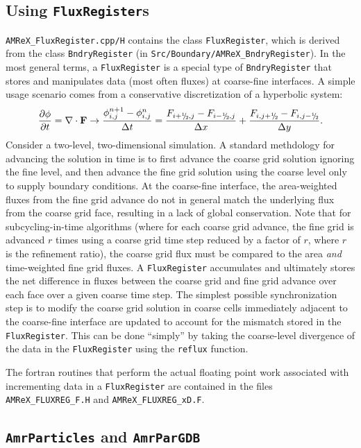 \subsection{Using {\tt FluxRegister}s}
{\tt AMReX\_FluxRegister.cpp/H} contains the class {\tt FluxRegister}, which is derived from
the class {\tt BndryRegister} (in {\tt Src/Boundary/AMReX\_BndryRegister}).
In the most general terms, a {\tt FluxRegister} is a special type of {\tt BndryRegister} that
stores and manipulates data (most often fluxes) at coarse-fine interfaces.
A simple usage scenario comes from a conservative discretization of a hyperbolic system:
\begin{equation}
\frac{\partial\phi}{\partial t} = \nabla\cdot{\bf F}
\rightarrow
\frac{\phi_{i,j}^{n+1}-\phi_{i,j}^n}{\Delta t} = \frac{F_{i+\myhalf,j}-F_{i-\myhalf,j}}{\Delta x} + \frac{F_{i,j+\myhalf} - F_{i,j-\myhalf}}{\Delta y}.
\end{equation}
Consider a two-level, two-dimensional simulation.  A standard methdology for advancing the solution in 
time is to first advance the coarse grid solution ignoring the fine level, and then advance the fine 
grid solution using the coarse level only to supply boundary conditions.  At the coarse-fine interface, 
the area-weighted fluxes from the fine grid advance do not in general match the underlying flux from 
the coarse grid face, resulting in a lack of global conservation.  Note that for subcycling-in-time algorithms
(where for each coarse grid advance, the fine grid is advanced $r$ times using a coarse grid time step 
reduced by a factor of $r$, where $r$ is the refinement ratio), the coarse grid flux must 
be compared to the area {\it and} time-weighted fine grid fluxes.  A {\tt FluxRegister} accumulates 
and ultimately stores the net difference in fluxes between the coarse grid and fine grid advance over 
each face over a given coarse time step.  The simplest possible synchronization step is to modify
the coarse grid solution in coarse cells immediately adjacent to the coarse-fine interface are updated
to account for the mismatch stored in the {\tt FluxRegister}.  This can be done ``simply'' by taking
the coarse-level divergence of the data in the {\tt FluxRegister} using the {\tt reflux} function.

The fortran routines that perform the actual floating point work associated with 
incrementing data in a {\tt FluxRegister} are
contained in the files {\tt AMReX\_FLUXREG\_F.H} and {\tt AMReX\_FLUXREG\_xD.F}.

\subsection{{\tt AmrParticles} and {\tt AmrParGDB}}

